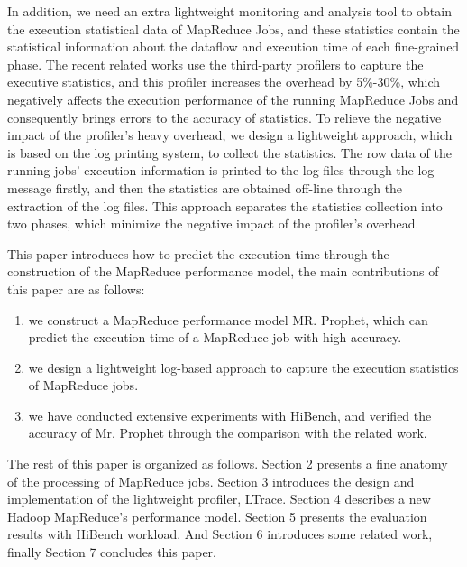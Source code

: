 In addition, we need an extra lightweight monitoring and analysis tool to obtain the execution statistical data of MapReduce Jobs, and these statistics contain the statistical information about the dataflow and execution time of each fine-grained phase. The recent related works use the third-party profilers to capture the executive statistics, and this profiler increases the overhead by 5\%-30\%, which negatively affects the execution performance of the running MapReduce Jobs and consequently brings errors to the accuracy of statistics. To relieve the negative impact of the profiler's heavy overhead, we design a lightweight approach, which is based on the log printing system, to collect the statistics. The row data of the running jobs' execution information is printed to the log files through the log message firstly, and then the statistics are obtained off-line through the extraction of the log files. This approach separates the statistics collection into two phases, which minimize the negative impact of the profiler's overhead.

This paper introduces how to predict the execution time through the construction of the MapReduce performance model, the main contributions of this paper are as follows:
\begin{enumerate}
    \item  we construct a MapReduce performance model MR. Prophet, which can predict the execution time of a MapReduce job with high accuracy.
    \item  we design a lightweight log-based approach to capture the execution statistics of MapReduce jobs.
    \item  we have conducted extensive experiments with HiBench, and verified the accuracy of Mr. Prophet through the comparison with the related work.
\end{enumerate}

The rest of this paper is organized as follows. Section 2 presents a fine anatomy of the processing of MapReduce jobs. Section 3 introduces the design and implementation of the lightweight profiler, LTrace. Section 4 describes a new Hadoop MapReduce's performance model. Section 5 presents the evaluation results with HiBench workload. And Section 6 introduces some related work, finally Section 7 concludes this paper.
